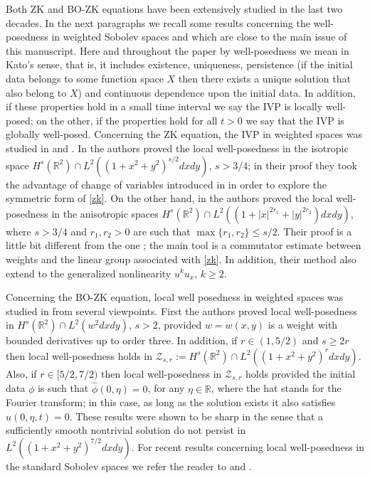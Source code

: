 \documentclass[reqno]{amsart}
\newcommand{\R}{\mathbb R}
\numberwithin{equation}{section}
\begin{document}
 Both ZK and BO-ZK equations have been extensively studied in the last two decades. In the next paragraphs we recall some results concerning the well-posedness in weighted Sobolev spaces and which are close to the main issue of this manuscript. Here and throughout the paper by well-posedness we mean in Kato's sense, that is, it includes existence, uniqueness, persistence (if the initial data belongs to some function space $X$ then there exists a unique solution that also belong to $X$) and continuous dependence upon the initial data. In addition, if these properties hold in a small time interval we say the IVP is locally well-posed; on the other, if the properties hold for all $t>0$ we say that the IVP is globally well-posed.  Concerning the ZK equation, the IVP in weighted spaces was studied in \cite{BUM} and \cite{FP}.  In  \cite{BUM} the authors proved the local well-posedness in the isotropic space $H^s(\R^2)\cap L^2((1+x^2+y^2)^{s/2}dxdy)$, $s>3/4$; in their proof they took the advantage of change of variables introduced in \cite{GHerr} in order to explore the symmetric form of \eqref{zk}. On the other hand, in \cite{FP} the authors proved the local well-posedness in the anisotropic spaces $H^s(\R^2)\cap L^2((1+|x|^{2r_1}+|y|^{2r_2})dxdy)$, where $s>3/4$ and $r_1,r_2>0$ are such that $\max\{r_1,r_2\}\leq s/2$. Their proof is a little bit different from the one \cite{BUM}; the main tool is a commutator estimate between weights and the linear group associated with \eqref{zk}. In addition, their method also extend to the generalized nonlinearity $u^ku_x$, $k\geq2$.
 
Concerning the BO-ZK equation, local well posedness in weighted spaces was studied in \cite{AP} from several viewpoints. First the authors proved local well-posedness in $H^s(\R^2)\cap L^2(w^2dxdy)$, $s>2$, provided $w=w(x,y)$ is a weight with bounded derivatives up to order three. In addition, if $r\in(1,5/2)$ and $s\geq2r$ then local well-posedness holds in $\mathcal{Z}_{s,r}:=H^s(\R^2)\cap L^2((1+x^2+y^2)^rdxdy)$. Also, if $r\in[5/2,7/2)$ then local well-posedness in $\mathcal{Z}_{s,r}$ holds provided the initial data $\phi$ is such that $\widehat{\phi}(0,\eta)=0$, for any $\eta\in\R$, where the hat stands for the Fourier transform; in this case, as long as the solution exists it also satisfies $\widehat{u}(0,\eta,t)=0$. These results were shown to be sharp in the sense that a sufficiently smooth nontrivial solution do not persist in $ L^2((1+x^2+y^2)^{7/2}dxdy)$. For recent results concerning local well-posedness in the standard  Sobolev spaces we refer the reader to \cite{APlow} and \cite{Nascimento}.
\end{document}
